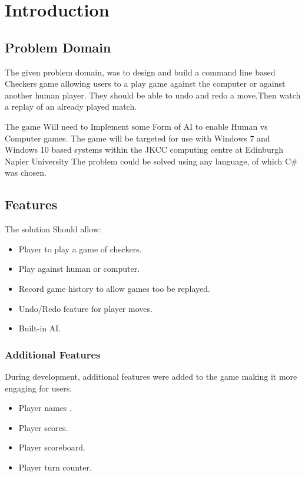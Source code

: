\documentclass[10pt, a4paper]{article}
\title{\mytitle}
\author{\myauthor\hspace{1em}\\\contact\\Edinburgh Napier University\hspace{0.5em}-\hspace{0.5em}\mymodule}
\date{}
\begin{document}
\maketitle   
    \section  {Introduction} 
    \subsection  {Problem Domain}
	The given problem domain, was to design and build a command line based Checkers game allowing users to a play game against the computer or against another human player. They should be able to undo and redo a move,Then watch a replay of an already played match.

The game Will need to Implement some Form of AI to enable Human vs Computer games. The game will be targeted for use with Windows 7 and Windows 10 based systems within the JKCC computing centre at Edinburgh Napier University The problem could be solved using any language, of which C\# was chosen.
 \subsection {Features}
	The solution Should allow:
\begin{itemize}
	 \item Player to play a game of checkers.
 	 \item Play against human or computer.
 	 \item Record game history to allow games too be replayed.
 	 \item Undo/Redo feature for player moves.	
	 \item Built-in AI.
	\end{itemize}	 
    \subsubsection  {Additional Features}
   	During development, additional features were added to the game making it more engaging for users.
	\begin{itemize}
 	 \item Player names .
 	 \item Player scores.
 	 \item Player scoreboard.
	 \item Player turn counter.	 
	\end{itemize}
\end{document}

